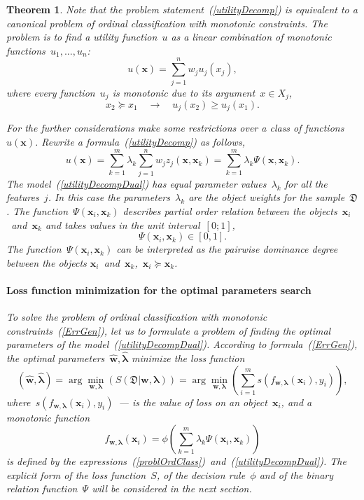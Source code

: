 \documentclass[12pt,preprint]{elsarticle}
\newcommand{\blambda}{\boldsymbol{\lambda}}
\newcommand{\bx}{\mathbf{x}}
\newcommand{\bw}{\mathbf{w}}
\newtheorem{Theorem}{Theorem}
\begin{document}
\begin{Theorem}
Note that the problem statement~(\ref{utilityDecomp}) is equivalent to a canonical problem of ordinal classification with monotonic constraints. The problem is to find a utility function~$u$ as a linear combination of monotonic functions~$u_1,...,u_n$:
\begin{equation}
u(\bx)=\sum\limits_{j=1}^n w_j u_j(x_j),
\label{problLinearMon}
\end{equation}
where every function~$u_j$ is monotonic due to its argument~$x\in X_j$,
\begin{equation}
x_2 \succeq x_1 \quad\rightarrow\quad u_j(x_2) \geq u_j(x_1).
\label{condMon}
\end{equation}

For the further considerations make some restrictions over a class of functions~$u(\bx)$.
Rewrite a formula~(\ref{utilityDecomp}) as follows,
\begin{equation}
u(\bx) = \sum\limits_{k=1}^m \lambda_{k} \sum\limits_{j=1}^n w_j z_j(\bx, \bx_k) = \sum\limits_{k=1}^m \lambda_{k} \Psi(\bx, \bx_k).
\label{utilityDecompDual}
\end{equation}
The model~(\ref{utilityDecompDual}) has equal parameter values~$\lambda_k$ for all the features~$j$. In this case the parameters~$\lambda_k$ are the object weights for the sample~$\mathfrak{D}$.
The function~$\Psi(\bx_i, \bx_k)$ describes partial order relation between the objects~$\bx_i$~and~$\bx_k$ and takes values in the unit interval~$[0;1]$,
\[
\Psi(\bx_i, \bx_k)\in[0,1].
\]
The function~$\Psi(\bx_i, \bx_k)$ can be interpreted as the pairwise dominance degree between the objects $\bx_i$~and~$\bx_k$,~$\bx_i\succeq\bx_k$.

\paragraph{Loss function minimization for the optimal parameters search}
To solve the problem of ordinal classification with monotonic constraints~(\ref{ErrGen}), let us to formulate a problem of finding the optimal parameters of the model~(\ref{utilityDecompDual}).
According to formula~(\ref{ErrGen}), the optimal parameters~$\hat{\bw},\hat{\blambda}$ minimize the loss function
\[
(\hat{\bw},\hat{\blambda})=\arg\min\limits_{\bw,\blambda}\left(S(\mathfrak{D}|\bw,\blambda)\right)=\arg\min\limits_{\bw,\blambda}\left(\sum\limits_{i=1}^m{s(f_{\bw,\blambda}(\bx_i), y_i)}\right),
\]
where~$s(f_{\bw,\blambda}(\bx_i), y_i)$~--- is the value of loss on an object~$\bx_i$, and a monotonic function
\begin{equation}
f_{\bw,\blambda}(\bx_i) = \phi\left(\sum\limits_{k=1}^m \lambda_{k} \Psi(\bx_i, \bx_k)\right)
\label{ordClassMdl}
\end{equation}
is defined by the expressions~(\ref{problOrdClass})~and~(\ref{utilityDecompDual}).
The explicit form of the loss function~$S$, of the decision rule~$\phi$ and of the binary relation function~$\Psi$ will be considered in the next section.

\end{Theorem}
\end{document}
